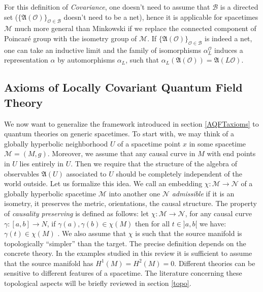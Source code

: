\documentclass[11pt]{article}
\newcommand{\fA}{\mathfrak{A}}
\newcommand{\Ncal}{\mathcal{N}}
\newcommand{\Mcal}{\mathcal{M}}
\newcommand{\Ocal}{\mathcal{O}}
\newcommand{\al}{\alpha}
\newcommand{\1}{\mathds{1}}                         %
\begin{document}
\begin{rem}
For this definition of \textit{Covariance}, one doesn't need to assume that $\mathcal{B}$ is a directed set ($\{\fA(\Ocal)\}_{\Ocal\in\mathcal{B}}$ doesn't need to be a net), hence it is applicable for spacetimes $\Mcal$ much more general than Minkowski if we replace the connected component of Poincar\'e group with the isometry group of $\Mcal$. If $\{\fA(\Ocal)\}_{\Ocal\in\mathcal{B}}$ is indeed a net, one can take an inductive limit and the family of isomorphisms $\alpha_L^\Ocal$ induces a representation $\al$ by automorphisms $\al_L$, such that $\al_L(\fA(\Ocal))=\fA(L\Ocal)$. 
\end{rem}
\subsection{Axioms of Locally Covariant Quantum Field Theory}\label{axioms}
We now want to generalize the framework introduced in section \ref{AQFTaxioms} to quantum theories on generic spacetimes. To start with, we may think of a globally hyperbolic neighborhood  $U$ of a spacetime point $x$ in some spacetime  $\Mcal=(M,g)$. 
Moreover, we assume that any causal curve in $M$ with end points in $U$ lies entirely 
in $U$. Then we require that the structure of the algebra of observables $\fA(U)$ associated to $U$ should be completely independent of the world outside. Let us formalize this idea. We call an embedding $\chi:\Mcal\to \Ncal$ of a globally hyperbolic spacetime $\mathcal{M}$ into another one $\Ncal$ \textit{admissible} if it is an isometry, it preserves the metric, orientations, the causal structure. The property of \textit{causality preserving} is defined as follows: let $\chi:\Mcal\to \Ncal$, for any causal curve $\gamma : [a,b]\to N$, if $\gamma(a),\gamma(b)\in\chi(M)$ then for all $t	\in ]a,b[$ we have: $\gamma(t)\in\chi(M)$ . We also assume that $\chi$ is such that the source manifold is topologically ``simpler'' than the target. The precise definition depends on the concrete theory. In the examples studied in this review it is sufficient to assume that the source manifold has $H^1(M)=H^2(M)={0}$. Different theories can be sensitive to different features of a spacetime. The literature concerning these topological aspects will be briefly reviewed in section \ref{topo}. 
\end{document}
